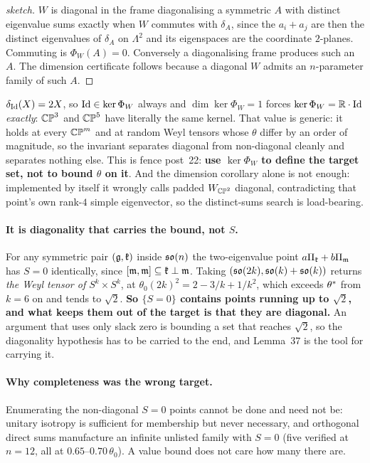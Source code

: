 \begin{proof}[sketch]
$W$ is diagonal in the frame diagonalising a symmetric $A$ with distinct eigenvalue sums exactly when $W$ commutes with $\delta_A$, since the $a_i+a_j$ are then the distinct eigenvalues of $\delta_A$ on $\Lambda^2$ and its eigenspaces are the coordinate $2$-planes. Commuting is $\Phi_W(A)=0$. Conversely a diagonalising frame produces such an $A$. The dimension certificate follows because a diagonal $W$ admits an $n$-parameter family of such $A$.
\end{proof}

\begin{remarkstar}
$\delta_{\mathrm{Id}}(X)=2X$, so $\mathrm{Id}\in\ker\Phi_W$ always and $\dim\ker\Phi_W=1$ forces $\ker\Phi_W=\mathbb{R}\cdot\mathrm{Id}$ \emph{exactly}: $\mathbb{CP}^3$ and $\mathbb{CP}^5$ have literally the same kernel. That value is generic: it holds at every $\mathbb{CP}^m$ and at random Weyl tensors whose $\theta$ differ by an order of magnitude, so the invariant separates diagonal from non-diagonal cleanly and separates nothing else. This is fence post~22: \textbf{use $\ker\Phi_W$ to define the target set, not to bound $\theta$ on it}. And the dimension corollary alone is not enough: implemented by itself it wrongly calls padded $W_{\mathbb{CP}^2}$ diagonal, contradicting that point's own rank-$4$ simple eigenvector, so the distinct-sums search is load-bearing.
\end{remarkstar}

\paragraph{It is diagonality that carries the bound, not $S$.} For any symmetric pair $(\mathfrak g,\mathfrak{k})$ inside $\mathfrak{so}(n)$ the two-eigenvalue point $a\Pi_{\mathfrak{k}}+b\Pi_{\mathfrak{m}}$ has $S=0$ identically, since $[\mathfrak{m},\mathfrak{m}]\subseteq\mathfrak{k}\perp\mathfrak{m}$. Taking $(\mathfrak{so}(2k),\mathfrak{so}(k)+\mathfrak{so}(k))$ returns \emph{the Weyl tensor of $S^k\times S^k$}, at $\theta_0(2k)^2=2-3/k+1/k^2$, which exceeds $\theta^{*}$ from $k=6$ on and tends to $\sqrt2$. \textbf{So $\{S=0\}$ contains points running up to $\sqrt2$, and what keeps them out of the target is that they are diagonal.} An argument that uses only slack zero is bounding a set that reaches $\sqrt2$, so the diagonality hypothesis has to be carried to the end, and Lemma~37 is the tool for carrying it.

\paragraph{Why completeness was the wrong target.} Enumerating the non-diagonal $S=0$ points cannot be done and need not be: unitary isotropy is sufficient for membership but never necessary, and orthogonal direct sums manufacture an infinite unlisted family with $S=0$ (five verified at $n=12$, all at $0.65$--$0.70\,\theta_0$). A value bound does not care how many there are.

